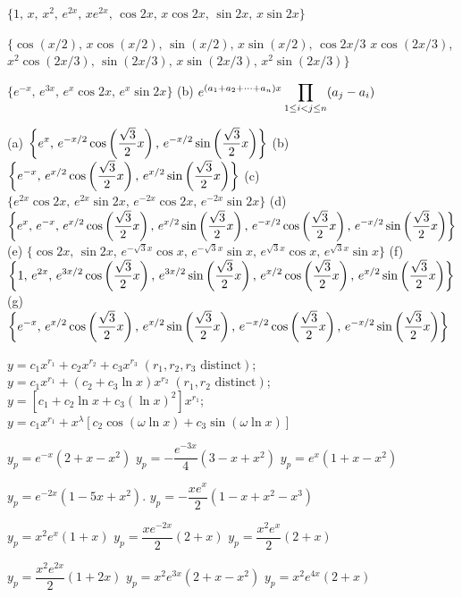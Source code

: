  $\{1,\,x,\,x^2,\,e^{2x},\,xe^{2x},\,\cos2x,\,x\cos2x,\,\sin2x,\,x\sin2x\}$

$\{\cos(x/2),\,x\cos(x/2),\,\sin(x/2),\,x\sin(x/2),\,\cos2x/3\,\,x\cos(2x/3)$,
$x^2\cos(2x/3),\,\sin(2x/3),\,x\sin(2x/3),\,x^2\sin(2x/3)\}$

 $\{e^{-x},\,e^{3x},\,e^x\cos2x,\,e^x\sin2x\}$\;
(b) $\displaystyle{e^{(a_1+a_2+\cdots+a_n)x}\prod_{1\le i<j\le
n}(a_j-a_i)}$

 (a)
$\displaystyle\left\{e^x,\,e^{-x/2}\cos\left(\frac{\sqrt3}{2}x\right),
\,e^{-x/2}\sin\left(\frac{\sqrt3}{2}x\right)\right\}$
(b) $\displaystyle\left\{e^{-x},\,e^{x/2}\cos\left(\frac{\sqrt3}{2}x\right),
\,e^{x/2}\sin\left(\frac{\sqrt3}{2}x\right)\right\}$
(c)
$\{e^{2x}\cos2x,\,e^{2x}\sin2x,\,e^{-2x}\cos2x,\,e^{-2x}\sin2x\}$
(d) $\displaystyle\left\{e^x,\,e^{-x}
,\,e^{x/2}\cos\left(\frac{\sqrt3}{2}x\right),
\,e^{x/2}\sin\left(\frac{\sqrt3}{2}x\right),
\,e^{-x/2}\cos\left(\frac{\sqrt3}{2}x\right),
\,e^{-x/2}\sin\left(\frac{\sqrt3}{2}x\right)\right\}$
(e)
 $\{\cos2x,\,\sin2x,\,e^{-\sqrt3x}\cos x,\,e^{-\sqrt3x}\sin x
,\,e^{\sqrt3x}\cos x,\,e^{\sqrt3x}\sin x\}$
(f)
$\displaystyle\left\{1,\,e^{2x}
,\,e^{3x/2}\cos\left(\frac{\sqrt3}{2}x\right),
\,e^{3x/2}\sin\left(\frac{\sqrt3}{2}x\right),
\,e^{x/2}\cos\left(\frac{\sqrt3}{2}x\right),
\,e^{x/2}\sin\left(\frac{\sqrt3}{2}x\right)\right\}$
(g)
$\displaystyle\left\{e^{-x}
,\,e^{x/2}\cos\left(\frac{\sqrt3}{2}x\right),
\,e^{x/2}\sin\left(\frac{\sqrt3}{2}x\right),
\,e^{-x/2}\cos\left(\frac{\sqrt3}{2}x\right),
\,e^{-x/2}\sin\left(\frac{\sqrt3}{2}x\right)\right\}$

$y=c_1x^{r_1}+c_2x^{r_2}+c_3x^{r_3}\;  (r_1, r_2,  r_3\text{ distinct})$;
$y=c_1x^{r_1}+(c_2+c_3 \ln x)x^{r_2}\;  (r_1, r_2 \text{ distinct})$;
$y=[c_1+c_2 \ln x+c_3(\ln x)^2]x^{r_1}$;
$y=c_1x^{r_1}+x^\lambda [c_2\cos(\omega \ln  x)+c_3\sin(\omega \ln x)]$


 $y_p=e^{-x}(2+x-x^2)$
 $y_p=-\dfrac{e^{-3x}}{4}(3-x+x^2)$
 $y_p=e^x(1+x-x^2)$

 $y_p=e^{-2x}(1-5x+x^2)$.
 $y_p=-\dfrac{xe^x}{2}(1-x+x^2-x^3)$

 $y_p=x^2e^x(1+x)$
 $y_p=\dfrac{xe^{-2x}}{2}(2+x)$
 $y_p=\dfrac{x^2e^x}{2}(2+x)$

 $y_p=\dfrac{x^2e^{2x}}{2}(1+2x)$
 $y_p=x^2e^{3x}(2+x-x^2)$
 $y_p=x^2e^{4x}(2+x)$


